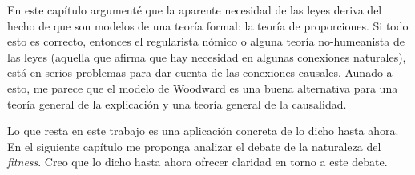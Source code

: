 En este capítulo argumenté que la aparente necesidad de las leyes deriva del hecho de que son modelos de una teoría formal: la teoría de proporciones. Si todo esto es correcto, entonces el regularista nómico o alguna teoría no-humeanista de las leyes (aquella que afirma que hay necesidad en algunas conexiones naturales), está en serios problemas para dar cuenta de las conexiones causales. Aunado a esto, me parece que el modelo de Woodward es una buena alternativa para una teoría general de la explicación y una teoría general de la causalidad.

Lo que resta en este trabajo es una aplicación concreta de lo dicho hasta ahora. En el siguiente capítulo me proponga analizar el debate de la naturaleza del \emph{fitness}. Creo que lo dicho hasta ahora ofrecer claridad en torno a este debate.

